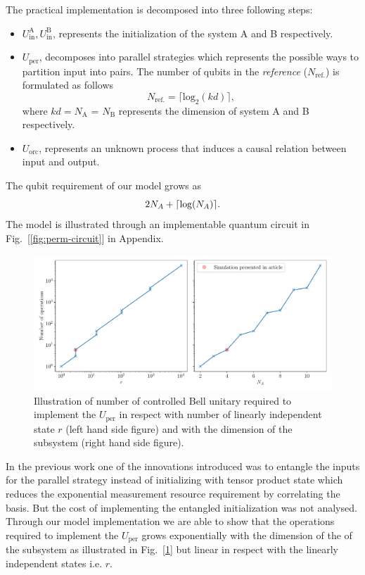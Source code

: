 \documentclass[
 aps,
 jmp,
 amsmath,amssymb,
 reprint,
]{revtex4-2}
\DeclarePairedDelimiter{\ceil}{\lceil}{\rceil}
\begin{document}
The practical implementation is decomposed into three following steps:
\begin{itemize}
	\item $ U_\textrm{in}^\textrm{A}, U_\textrm{in}^\textrm{B} $, represents the initialization of the system A and B respectively.
	\item $U_\textrm{per}$, decomposes into parallel strategies which represents the possible ways to partition input into pairs.
	The number of qubits in the \textit{reference} ($N_{\textrm{ref.}}$) is formulated as follows
	\begin{equation}
	N_{\textrm{ref.}} = \lceil \textrm{log}_2 (kd) \rceil,
	\end{equation}
	where $kd = N_\textrm{A}$ = $N_\textrm{B}$ represents the dimension of system A and B respectively.
	\item $U_\textrm{orc}$, represents an unknown process that induces a causal relation between input and output.
\end{itemize}
The qubit requirement of our model grows as
\begin{equation}
2N_A + \ceil{\log( N_A )}. 
\end{equation}
The model is illustrated through an implementable quantum circuit in Fig.~[\ref{fig:perm-circuit}] in Appendix.
\begin{figure}[tbh!]
	\centering
	\includegraphics[width = \linewidth]{plot/number_of_operations.pdf}
	\caption{Illustration of number of controlled Bell unitary required to implement the $U_\textrm{per}$ in respect with number of linearly independent state $r$ (left hand side figure) and with the dimension of the subsystem (right hand side figure).}
	\label{fig:permutation-resource}
\end{figure}
In the previous work one of the innovations introduced was to entangle the inputs for the parallel strategy instead of initializing with tensor product state which reduces the exponential measurement resource requirement by correlating the basis. But the cost of implementing the entangled initialization was not analysed. Through our model implementation we are able to show that the operations required to implement the $U_\textrm{per}$ grows exponentially with the dimension of the of the subsystem as illustrated in Fig.~[\ref{fig:permutation-resource}] but linear in respect with the linearly independent states i.e. $r$.
\end{document}
